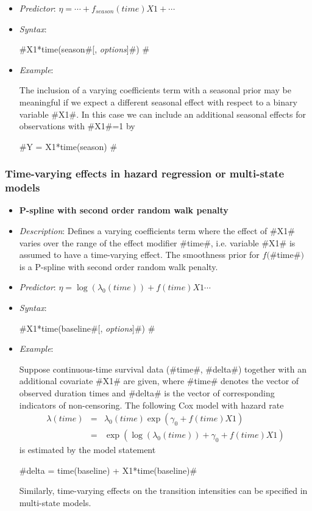 \begin{itemize}
\item[] {\em Predictor}: $\eta= \cdots + f_{season}(time)X1 +
\cdots $

\item[] {\em Syntax}:

#X1*time(season#[, {\em options}]#) #
\item[] {\em Example}:

The inclusion of a varying coefficients term with a seasonal prior
may be meaningful if we expect a different seasonal effect with
respect to a binary variable #X1#. In this case we can include an
additional seasonal effects for observations with #X1#=1 by

#Y = X1*time(season) #

\end{itemize}

\subsubsection*{Time-varying effects in hazard regression or multi-state models}

\begin{itemize}
\item[]{\bf\sffamily P-spline with second order random walk
penalty}

\item[] {\em Description}: Defines a varying coefficients term
where the effect of #X1# varies over the range of the effect
modifier #time#, i.e. variable #X1# is assumed to have a
time-varying effect. The smoothness prior for $f($#time#$)$ is a
P-spline with second order random walk penalty.

 \item[] {\em Predictor}: $\eta = \log(\lambda_0(time)) +
f(time)X1 \cdots$ \item[] {\em Syntax}:

 #X1*time(baseline#[, {\em options}]#) #
 \item[] {\em Example}:

Suppose continuous-time survival data (#time#, #delta#) together
with an additional covariate #X1# are given, where #time# denotes
the vector of observed duration times and #delta# is the vector of
corresponding indicators of non-censoring. The following Cox model
with hazard rate
\begin{eqnarray*}
 \lambda(time) & = & \lambda_0(time)\exp(\gamma_0 + f(time)X1)\\
 & = & \exp\left(\log(\lambda_0(time)) + \gamma_0 + f(time)X1\right)
\end{eqnarray*}
is estimated by the model statement

#delta = time(baseline) + X1*time(baseline)#

Similarly, time-varying effects on the transition intensities can
be specified in multi-state models.
\end{itemize}


